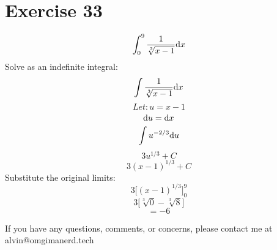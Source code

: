 \documentclass[letterpaper, 12pt]{math}
\begin{document}
\section*{Exercise 33}
\[ \int_{0}^{9}{\frac{1}{\sqrt[3]{x-1}}\mathrm{d}{x}} \]
Solve as an indefinite integral:
\[ \int{\frac{1}{\sqrt[3]{x-1}}\mathrm{d}{x}} \]
\[ Let: u = x-1 \]
\[ \mathrm{d}{u} = \mathrm{d}{x} \]
\[ \int{u^{-2/3}\mathrm{d}{u}} \]
\[ 3u^{1/3}+C \]
\[ 3(x-1)^{1/3}+C \]
Substitute the original limits:
\[ 3\bigg[(x-1)^{1/3}\bigg]_{0}^{9} \]
\[ 3\bigg[\sqrt[3]{0}-\sqrt[3]{8}] \]
\[ = -6 \]

\begin{center}
  If you have any questions, comments, or concerns, please contact me at
  alvin@omgimanerd.tech
\end{center}
\end{document}
